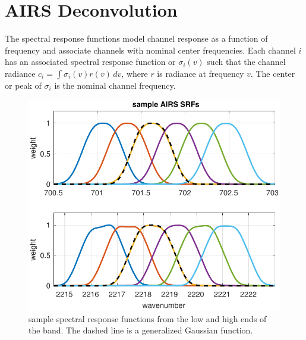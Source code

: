 \documentclass[10pt,twocolumn]{article}  %
\begin{document}
\FloatBarrier
\section{AIRS Deconvolution}
\label{decon}

The {\airs} spectral response functions model channel response as a
function of frequency and associate channels with nominal center
frequencies.  Each {\airs} channel $i$ has an associated spectral
response function or {\srf} $\sigma_i(v)$ such that the channel
radiance $c_i = \int \sigma_i(v)r(v)\,dv$, where $r$ is radiance at
frequency $v$.  The center or peak of $\sigma_i$ is the nominal
channel frequency.

\begin{figure} %
  \centering
  \includegraphics[width=\linewidth]{figures/airs_sample_SRF.pdf}
  \caption{sample {\airs} spectral response functions from the low
    and high ends of the band.   The dashed line is a generalized
    Gaussian function.}
  \label{srfs1}
\end{figure}
\end{document}
